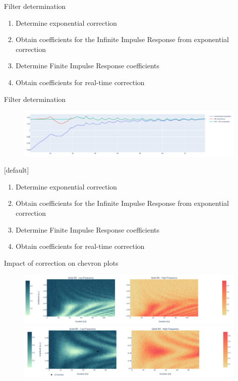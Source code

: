 \documentclass[aspectratio=169,10pt]{beamer}
\begin{document}
\begin{frame}{Filter determination}
  \begin{enumerate}[leftmargin=*, label=\arabic*.]
    \item<1-> Determine exponential correction
    \item<2-> Obtain coefficients for the Infinite Impulse Response from exponential correction
    \item<3-> Determine Finite Impulse Response coefficients
    \item<4-> Obtain coefficients for real-time correction
  \end{enumerate}
\end{frame}

\begin{frame}{Filter determination}
  \begin{figure}
    \centering
    \includegraphics[width=\textwidth]{figures/B4_ringin.png}
  \end{figure}
  \vspace{0.5em}
  {[default]
    \begin{enumerate}[leftmargin=*, label=\arabic*.]
      \item Determine exponential correction
      \item Obtain coefficients for the Infinite Impulse Response from exponential correction
      \item Determine Finite Impulse Response coefficients
      \item Obtain coefficients for real-time correction
    \end{enumerate}}
\end{frame}

\begin{frame}{Impact of correction on chevron plots}
  \begin{figure}
    \centering
    \includegraphics[width=\textwidth]{figures/B2B4_nofilter.png}
    \vfill
    \includegraphics[width=\textwidth]{figures/B2B4.png}
  \end{figure}
\end{frame}
\end{document}
